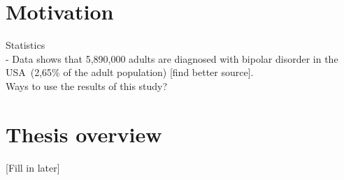 
\section{Motivation}
Statistics\\
- Data shows that 5,890,000 adults are diagnosed with bipolar disorder in the USA (2,65\% of the adult population) [find better source].
\\

\noindent Ways to use the results of this study? 


\section{Thesis overview}
[Fill in later]

